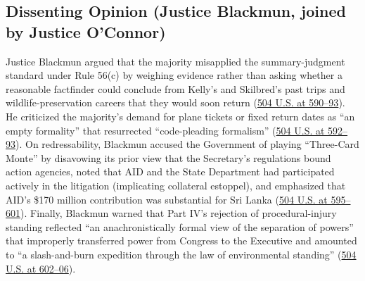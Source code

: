 \documentclass[12pt]{article}
\begin{document}
\subsection{Dissenting Opinion (Justice Blackmun, joined by Justice O'Connor)}
Justice Blackmun argued that the majority misapplied the summary-judgment standard under Rule 56(c) by weighing evidence rather than asking whether a reasonable factfinder could conclude from Kelly's and Skilbred's past trips and wildlife-preservation careers that they would soon return (\href{https://supreme.justia.com/cases/federal/us/504/555/}{504 U.S. at 590--93}). He criticized the majority's demand for plane tickets or fixed return dates as ``an empty formality'' that resurrected ``code-pleading formalism'' (\href{https://supreme.justia.com/cases/federal/us/504/555/}{504 U.S. at 592--93}). On redressability, Blackmun accused the Government of playing ``Three-Card Monte'' by disavowing its prior view that the Secretary's regulations bound action agencies, noted that AID and the State Department had participated actively in the litigation (implicating collateral estoppel), and emphasized that AID's \$170 million contribution was substantial for Sri Lanka (\href{https://supreme.justia.com/cases/federal/us/504/555/}{504 U.S. at 595--601}). Finally, Blackmun warned that Part IV's rejection of procedural-injury standing reflected ``an anachronistically formal view of the separation of powers'' that improperly transferred power from Congress to the Executive and amounted to ``a slash-and-burn expedition through the law of environmental standing'' (\href{https://supreme.justia.com/cases/federal/us/504/555/}{504 U.S. at 602--06}).
\end{document}
